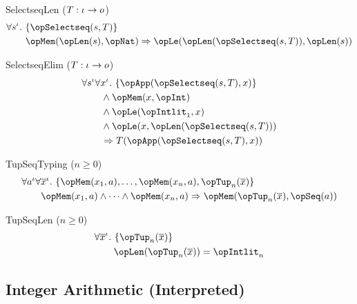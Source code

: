 \documentclass[11pt, a4paper, oneside]{article}
\begin{document}
\begin{axioms}
\item[SelectseqLen ($T : \iota \rightarrow o$)] \[
        \begin{aligned}
            &\forall s^\idv.\, \st{ \opSelectseq(s, T) } \\
            &\qquad \opMem(\opLen(s), \opNat) \imp \opLe(\opLen(\opSelectseq(s, T)), \opLen(s))
        \end{aligned}
    \]

\item[SelectseqElim ($T : \iota \rightarrow o$)] \[
        \begin{aligned}
            &\forall s^\idv \forall x^\idv.\, \st{ \opApp(\opSelectseq(s, T), x) } \\
            &\qquad \wedge \opMem(x, \opInt) \\
            &\qquad \wedge \opLe(\opIntlit_1, x) \\
            &\qquad \wedge \opLe(x, \opLen(\opSelectseq(s, T))) \\
            &\qquad \imp T(\opApp(\opSelectseq(s, T), x))
        \end{aligned}
    \]

\item[TupSeqTyping ($n \ge 0$)] \[
        \begin{aligned}
            &\forall a^\idv \forall \overline{x}^\idv.\, \st{ \opMem(x_1, a), \dots, \opMem(x_n, a), \opTup_n(\overline{x}) } \\
            &\qquad \opMem(x_1, a) \wedge \dots \wedge \opMem(x_n, a) \imp \opMem(\opTup_n(\overline{x}), \opSeq(a))
        \end{aligned}
    \]

\item[TupSeqLen ($n \ge 0$)] \[
        \begin{aligned}
            &\forall \overline{x}^\idv.\, \st{ \opTup_n(\overline{x}) } \\
            &\qquad \opLen(\opTup_n(\overline{x})) = \opIntlit_n
        \end{aligned}
    \]

\end{axioms}


    \subsection{Integer Arithmetic (Interpreted)}
    \label{subsec:ints_interpreted}
\end{document}
